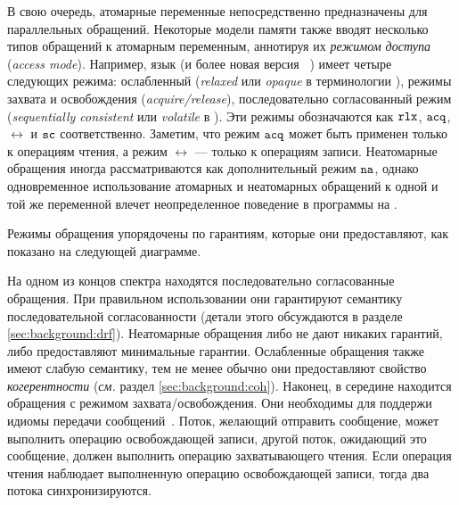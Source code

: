 В свою очередь, атомарные переменные непосредственно 
предназначены для параллельных обращений. 
Некоторые модели памяти также вводят 
несколько типов обращений к атомарным переменным,  аннотируя их 
 \emph{режимом доступа} (\emph{access mode}).
Например, язык \CPP (и более новая версия \Java~\cite{Bender-Palsberg:OOPSLA19})
имеет четыре следующих режима: ослабленный (\emph{relaxed}
или \emph{opaque} в терминологии \Java),
режимы захвата и освобождения (\emph{acquire/release}), 
последовательно согласованный режим (\emph{sequentially consistent}
или  \emph{volatile} в \Java). 
Эти режимы обозначаются как $\mathtt{rlx}$, ${\mathtt{acq}}$, $\rel$ и ${\mathtt{sc}}$ соответственно.
Заметим, что режим ${\mathtt{acq}}$ может быть применен только к операциям чтения,
а режим $\rel$ --- только к операциям записи.
Неатомарные обращения иногда рассматриваются как дополнительный режим $\mathtt{na}$, 
однако  одновременное использование атомарных 
и неатомарных обращений к одной и той же переменной 
влечет неопределенное поведение в программы на \CPP.

Режимы обращения упорядочены по гарантиям, 
которые они предоставляют, как показано на следующей диаграмме. 




На одном из концов спектра находятся последовательно согласованные обращения.
При правильном использовании они гарантируют семантику 
последовательной согласованности
(детали этого обсуждаются в разделе \cref{sec:background:drf}).
Неатомарные обращения либо не дают никаких гарантий, 
либо предоставляют минимальные гарантии. 
Ослабленные обращения также имеют слабую семантику, 
тем не менее обычно они предоставляют свойство \emph{когерентности}
(\emph{см.} раздел \cref{sec:background:coh}).
Наконец, в середине находится обращения с режимом захвата/освобождения. 
Они необходимы для поддержи идиомы передачи сообщений~\cite{Lahav-al:POPL16}.
Поток, желающий отправить сообщение, может выполнить операцию освобождающей записи, 
другой поток, ожидающий это сообщение, должен выполнить операцию захватывающего чтения. 
Если операция чтения наблюдает выполненную операцию освобождающей записи, 
тогда два потока синхронизируются.

